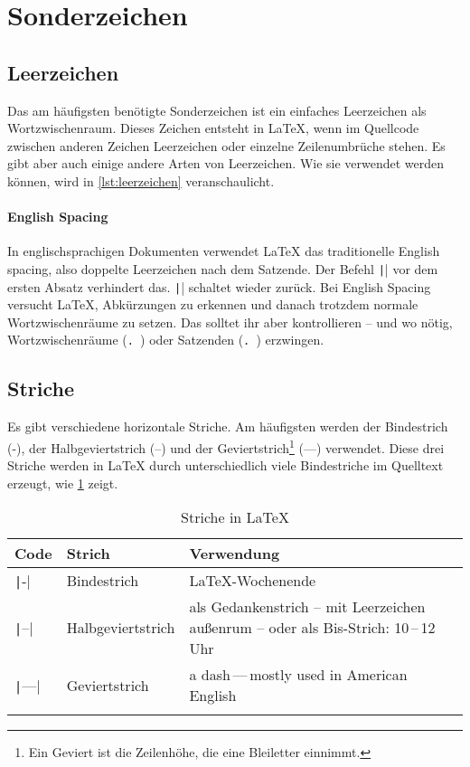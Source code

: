 \section{Sonderzeichen}

\subsection{Leerzeichen}

Das am häufigsten benötigte Sonderzeichen ist ein einfaches Leerzeichen als Wortzwischenraum.
Dieses Zeichen entsteht in \LaTeX, wenn im Quellcode zwischen anderen Zeichen Leerzeichen oder einzelne Zeilenumbrüche stehen.
Es gibt aber auch einige andere Arten von Leerzeichen.
Wie sie verwendet werden können, wird in \cref{lst:leerzeichen} veranschaulicht.


\paragraph{English Spacing}
In englischsprachigen Dokumenten verwendet LaTeX das traditionelle English spacing, also doppelte Leerzeichen nach dem Satzende.
Der Befehl \texttt|\frenchspacing| vor dem ersten Absatz verhindert das.
\texttt|\nonfrenchspacing| schaltet wieder zurück.
Bei English Spacing versucht \LaTeX, Abkürzungen zu erkennen und danach trotzdem normale Wortzwischenräume zu setzen.
Das solltet ihr aber kontrollieren – und wo nötig,
Wortzwischenräume (\texttt{.\ }) oder Satzenden (\texttt{\@. }) erzwingen.

\subsection{Striche}
Es gibt verschiedene horizontale Striche.
Am häufigsten werden der Bindestrich (-), der Halbgeviertstrich (–) und der Geviertstrich\footnote{Ein Geviert ist die Zeilenhöhe, die eine Bleiletter einnimmt.} (—) verwendet.
Diese drei Striche werden in \LaTeX{} durch unterschiedlich viele Bindestriche im Quelltext erzeugt, wie \cref{tbl:striche} zeigt.

\begin{longtable}{@{}llp{7.8cm}@{}}
	\toprule
	Code       & Strich            & Verwendung \\
	\midrule
	\texttt|-|   & Bindestrich       & \LaTeX-Wochenende \\
	\texttt|--|  & Halbgeviertstrich & als Gedankenstrich – mit Leerzeichen außenrum – oder als Bis-Strich: 10\,–\,12 Uhr \\
	\texttt|---| & Geviertstrich     & a dash\,—\,mostly used in American English \\
	\bottomrule
	\caption{Striche in \LaTeX}
	\label{tbl:striche}
\end{longtable}

